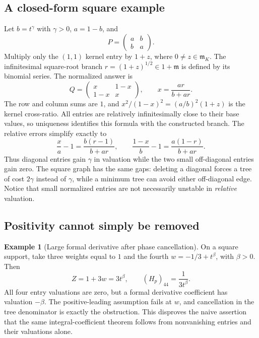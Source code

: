 \documentclass[11pt,a4paper]{article}
\numberwithin{equation}{section}
\theoremstyle{definition}
\newtheorem{example}[theorem]{Example}
\newcommand{\mm}{\mathfrak m}
\begin{document}
\subsection{A closed-form square example}
Let $b=t^\gamma$ with $\gamma>0$, $a=1-b$, and
\[
 P=\begin{pmatrix}a&b\\b&a\end{pmatrix}.
\]
Multiply only the $(1,1)$ kernel entry by $1+z$, where
$0\ne z\in\mm_K$. The infinitesimal square-root branch
$r=(1+z)^{1/2}\in1+\mm$ is defined by its binomial series. The
normalized answer is
\begin{equation}\label{scale:eq:squareexact}
 Q=\begin{pmatrix}x&1-x\\1-x&x\end{pmatrix},\qquad
 x=\frac{ar}{b+ar}.
\end{equation}
The row and column sums are $1$, and
$x^2/(1-x)^2=(a/b)^2(1+z)$ is the kernel cross-ratio. All entries
are relatively infinitesimally close to their base values, so
uniqueness identifies this formula with the constructed branch.
The relative errors simplify exactly to
\begin{equation}\label{scale:eq:squareerrors}
 \frac{x}{a}-1=\frac{b(r-1)}{b+ar},\qquad
 \frac{1-x}{b}-1=\frac{a(1-r)}{b+ar}.
\end{equation}
Thus diagonal entries gain $\gamma$ in valuation while the two
small off-diagonal entries gain zero. The square graph has the
same gaps: deleting a diagonal forces a tree of cost $2\gamma$
instead of $\gamma$, while a minimum tree can avoid either
off-diagonal edge. Notice that small normalized entries are not
necessarily unstable in \emph{relative} valuation.

\subsection{Positivity cannot simply be removed}
\begin{example}[Large formal derivative after phase cancellation]
\label{scale:ex:phasejacobian}
On a square support, take three weights equal to $1$ and the fourth
$w=-1/3+t^\beta$, with $\beta>0$. Then
\[
 Z=1+3w=3t^\beta,\qquad (H_p)_{44}=\frac{1}{3t^\beta}.
\]
All four entry valuations are zero, but a formal derivative
coefficient has valuation $-\beta$. The positive-leading assumption
fails at $w$, and cancellation in the tree denominator is exactly
the obstruction. This disproves the naive assertion that the same
integral-coefficient theorem follows from nonvanishing entries and
their valuations alone.
\end{example}
\end{document}
